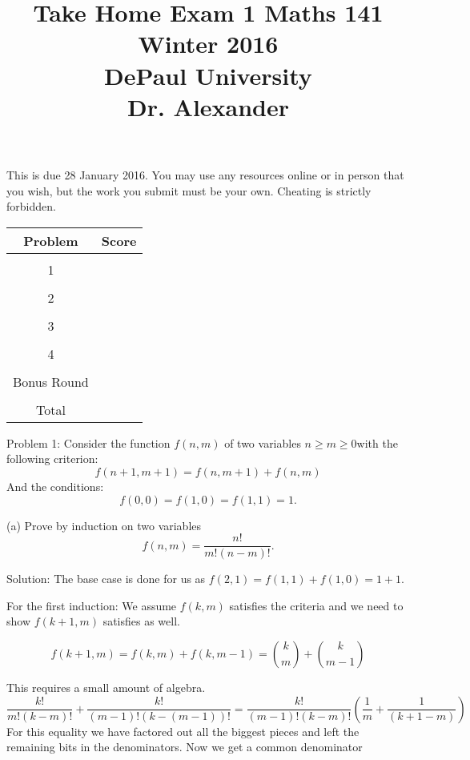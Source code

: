 \documentclass[16 pt]{amsart}
\theoremstyle{definition}
\theoremstyle{remark}
\numberwithin{equation}{subsection}
\begin{document}
\title{Take Home Exam 1 Maths 141 Winter 2016 \\ DePaul University\\Dr. Alexander}
\maketitle
This is due 28 January 2016.  You may use any resources online or in person that you wish, but the work you submit must be your own.  Cheating is strictly forbidden.
\vspace{1in}


\begin{center}
  \begin{tabular}{ c | c }
    Problem & Score\\
    \hline
    &\\
    1&\\
    &\\
    2&\\
    &\\
    3&\\
    &\\
    4&\\
    &\\
    Bonus Round 
    &\\
    \hline 
    &\\    
    Total& 
 \end{tabular}
\end{center}


\newpage


Problem 1: Consider the function $f(n,m)$ of two variables $n\ge m \ge 0$with the following criterion:
\[
f(n+1,m+1) = f(n,m+1) + f(n,m) 
\]
And the conditions:
\[
f(0,0)= f(1,0) = f(1,1) = 1.
\]

(a) Prove by induction on two variables
\[
f(n,m) = \frac{n!}{m!(n-m)!}.
\]

\vspace{.5in}

Solution: The base case is done for us as $f(2,1) = f(1,1) + f(1,0) = 1+1$.


For the first induction:  We assume $f(k,m)$ satisfies the criteria and we need to show $f(k+1,m)$ satisfies as well.

\[
f(k+1,m) = f(k,m) + f(k,m-1) = {k \choose m} + {k \choose m-1}
\]

This requires a small amount of algebra.
\[
\frac{k!}{m!(k-m)!} + \frac{k!}{(m-1)!(k-(m-1))!}  = \frac{k!}{(m-1)!(k-m)!}\left(\frac{1}{m} + \frac{1}{(k+1-m)}\right)
\]
For this equality we have factored out all the biggest pieces and left the remaining bits in the denominators.  Now we get a common denominator
\end{document}
